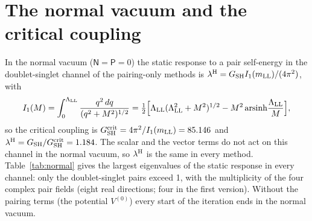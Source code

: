 \documentclass[aps,prd,onecolumn,superscriptaddress,nofootinbib,floatfix,longbibliography]{revtex4-2}
\newcommand{\LL}{{\rm LL}}
\newcommand{\SH}{{\rm SH}}
\begin{document}
\section{The normal vacuum and the critical coupling}
\label{sec:normal}

In the normal vacuum ($\mathsf N=\mathsf P=0$) the static response to a pair self-energy in the doublet-singlet channel of
the pairing-only methods is $\lambda^{\rm H}=G_\SH I_1(m_\LL)/(4\pi^2)$, with
\begin{equation}
I_1(M)=\int_0^{\Lambda_\LL}\frac{q^2\,dq}{(q^2+M^2)^{1/2}}=\tfrac12\Big[\Lambda_\LL(\Lambda_\LL^2+M^2)^{1/2}-M^2\,{\rm arsinh}\frac{\Lambda_\LL}{M}\Big],
\label{eq:I1}
\end{equation}
so the critical coupling is $G^{\rm crit}_\SH=4\pi^2/I_1(m_\LL)=85.146$ and $\lambda^{\rm H}=G_\SH/G^{\rm crit}_\SH=1.184$.
The scalar and the vector terms do not act on this channel in the normal vacuum, so $\lambda^{\rm H}$ is the same in every
method. Table~\ref{tab:normal} gives the largest eigenvalues of the static response in every channel: only the
doublet-singlet pairs exceed 1, with the multiplicity of the four complex pair fields (eight real directions; four in the
first version). Without the pairing terms (the potential $V^{(0)}$) every start of the iteration ends in the normal vacuum.
\end{document}
